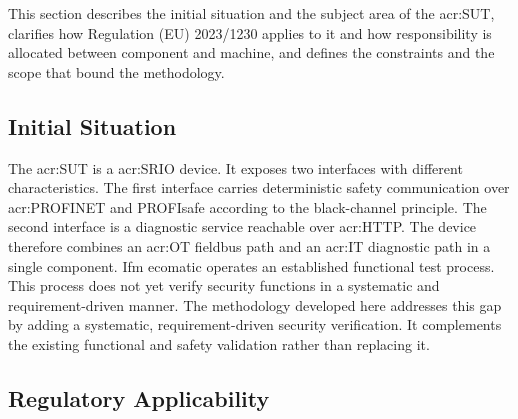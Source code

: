 This section describes the initial situation and the subject area of the \gls{acr:SUT}, clarifies how Regulation (EU) 2023/1230 applies to it and how responsibility is allocated between component and machine, and defines the constraints and the scope that bound the methodology. 

\subsection{Initial Situation} 
\label{subsec:initial_situation} 

The \gls{acr:SUT} is a \gls{acr:SRIO} device. It exposes two interfaces with different characteristics. The first interface carries deterministic safety communication over \gls{acr:PROFINET} and PROFIsafe according to the black-channel principle. The second interface is a diagnostic service reachable over \gls{acr:HTTP}. The device therefore combines an \gls{acr:OT} fieldbus path and an \gls{acr:IT} diagnostic path in a single component. Ifm ecomatic operates an established functional test process. This process does not yet verify security functions in a systematic and requirement-driven manner. The methodology developed here addresses this gap by adding a systematic, requirement-driven security verification. It complements the existing functional and safety validation rather than replacing it. 

\subsection{Regulatory Applicability} 
\label{subsec:regulatory_applicability} 

